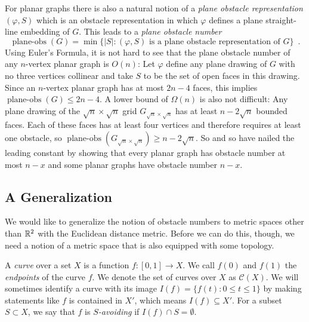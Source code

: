 \documentclass{patmorin}
\DeclareMathOperator{\planeobs}{plane-obs}
\begin{document}
For planar graphs there is also a natural notion of a \emph{plane obstacle
representation} $(\varphi, S)$ which is an obstacle representation
in which $\varphi$ defines a plane straight-line embedding of $G$.
This leads to a \emph{plane obstacle number}
\[
    \planeobs(G) = \min\{|S| :\text{$(\varphi, S)$ is a plane obstacle representation of $G$}\} \enspace .
\]
Using Euler's Formula, it is not hard to see that the plane obstacle
number of any $n$-vertex planar graph is $O(n)$: Let $\varphi$ define
any plane drawing of $G$ with no three vertices collinear and take $S$
to be the set of open faces in this drawing.  Since an $n$-vertex planar
graph has at most $2n-4$ faces, this implies $\planeobs(G)\le 2n-4$.
A lower bound of $\Omega(n)$ is also not difficult:  Any plane drawing
of the $\sqrt{n}\times\sqrt{n}$ grid $G_{\sqrt{n}\times\sqrt{n}}$
has at least $n-2\sqrt{n}$ bounded faces. Each of these faces has
at least four vertices and therefore requires at least one obstacle,
so $\planeobs(G_{\sqrt{n}\times\sqrt{n}})\ge n-2\sqrt{n}$.  So and so
\cite{X} have nailed the leading constant by showing that every planar
graph has obstacle number at most $n-x$ and some planar graphs have
obstacle number $n-x$.

\subsection{A Generalization}

We would like to generalize the notion of obstacle numbers to metric
spaces other than $\mathbb{R}^2$ with the Euclidean distance metric.  Before we
can do this, though, we need a notion of a metric space that is also
equipped with some topology.

A \emph{curve} over a set $X$ is a function $f:[0,1]\to X$.  We call
$f(0)$ and $f(1)$ the \emph{endpoints} of the curve $f$.  We denote the
set of curves over $X$ as $\mathcal{C}(X)$.  We will sometimes identify a
curve with its image $I(f)=\{f(t):0\le t\le 1\}$ by making statements like
$f$ is contained in $X'$, which means $I(f)\subseteq X'$.  For a subset
$S\subset X$, we say that $f$ is \emph{$S$-avoiding} if $I(f)\cap S=\emptyset$.
\end{document}
